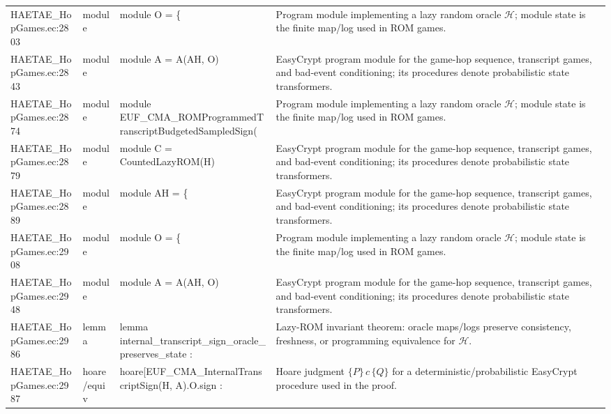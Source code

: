 \documentclass[10pt]{article}
\begin{document}
\begin{longtable}{L{0.11\textwidth}L{0.055\textwidth}L{0.385\textwidth}L{0.41\textwidth}}
HAETAE\_\allowbreak{}HopGames.\allowbreak{}ec:\allowbreak{}2803 & module & {\ttfamily\scriptsize module O = \{} & Program module implementing a lazy random oracle $\mathcal H$; module state is the finite map/log used in ROM games. \\
HAETAE\_\allowbreak{}HopGames.\allowbreak{}ec:\allowbreak{}2843 & module & {\ttfamily\scriptsize module A = A(AH, O)} & EasyCrypt program module for the game-hop sequence, transcript games, and bad-event conditioning; its procedures denote probabilistic state transformers. \\
HAETAE\_\allowbreak{}HopGames.\allowbreak{}ec:\allowbreak{}2874 & module & {\ttfamily\scriptsize module EUF\_\allowbreak{}CMA\_\allowbreak{}ROMProgrammedTranscriptBudgetedSampledSign(} & Program module implementing a lazy random oracle $\mathcal H$; module state is the finite map/log used in ROM games. \\
HAETAE\_\allowbreak{}HopGames.\allowbreak{}ec:\allowbreak{}2879 & module & {\ttfamily\scriptsize module C = CountedLazyROM(H)} & EasyCrypt program module for the game-hop sequence, transcript games, and bad-event conditioning; its procedures denote probabilistic state transformers. \\
HAETAE\_\allowbreak{}HopGames.\allowbreak{}ec:\allowbreak{}2889 & module & {\ttfamily\scriptsize module AH = \{} & EasyCrypt program module for the game-hop sequence, transcript games, and bad-event conditioning; its procedures denote probabilistic state transformers. \\
HAETAE\_\allowbreak{}HopGames.\allowbreak{}ec:\allowbreak{}2908 & module & {\ttfamily\scriptsize module O = \{} & Program module implementing a lazy random oracle $\mathcal H$; module state is the finite map/log used in ROM games. \\
HAETAE\_\allowbreak{}HopGames.\allowbreak{}ec:\allowbreak{}2948 & module & {\ttfamily\scriptsize module A = A(AH, O)} & EasyCrypt program module for the game-hop sequence, transcript games, and bad-event conditioning; its procedures denote probabilistic state transformers. \\
HAETAE\_\allowbreak{}HopGames.\allowbreak{}ec:\allowbreak{}2986 & lemma & {\ttfamily\scriptsize lemma internal\_\allowbreak{}transcript\_\allowbreak{}sign\_\allowbreak{}oracle\_\allowbreak{}preserves\_\allowbreak{}state :} & Lazy-ROM invariant theorem: oracle maps/logs preserve consistency, freshness, or programming equivalence for $\mathcal H$. \\
HAETAE\_\allowbreak{}HopGames.\allowbreak{}ec:\allowbreak{}2987 & hoare/equiv & {\ttfamily\scriptsize hoare[EUF\_\allowbreak{}CMA\_\allowbreak{}InternalTranscriptSign(H, A).O.sign :} & Hoare judgment $\{P\}\,c\,\{Q\}$ for a deterministic/probabilistic EasyCrypt procedure used in the proof. \\

\end{longtable}
\end{document}
